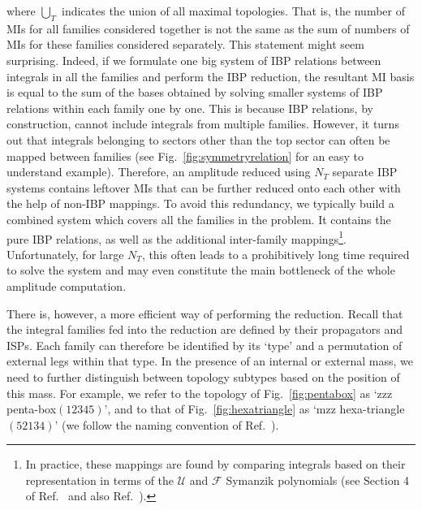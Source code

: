 \documentclass[main.tex]{subfiles}
\begin{document}
where $\bigcup_T$ indicates the union of all maximal topologies. That is, the number of MIs for all families considered together is not the same as the sum of numbers of MIs for these families considered separately. This statement might seem surprising. Indeed, if we formulate one big system of IBP relations between integrals in all the families and perform the IBP reduction, the resultant MI basis is equal to the sum of the bases obtained by solving smaller systems of IBP relations within each family one by one. This is because IBP relations, by construction, cannot include integrals from multiple families. However, it turns out that integrals belonging to sectors other than the top sector can often be mapped between families (see  Fig.~\ref{fig:symmetryrelation} for an easy to understand example). Therefore, an amplitude reduced using $N_T$ separate IBP systems contains leftover MIs that can be further reduced onto each other with the help of non-IBP mappings. To avoid this redundancy, we typically build a combined system which covers all the families in the problem. It contains the pure IBP relations, as well as the additional inter-family mappings\footnote{In practice, these mappings are found by comparing integrals based on their representation in terms of the $\mathcal{U}$ and $\mathcal{F}$ Symanzik polynomials (see Section 4 of Ref.~\cite{Lee:2012cn} and also Ref.~\cite{Pak:2011xt}).}. Unfortunately, for large $N_T$, this often leads to a prohibitively long time required to solve the system and may even constitute the main bottleneck of the whole amplitude computation.

There is, however, a more efficient way of performing the reduction. Recall that the integral families fed into the reduction are defined by their propagators and ISPs. Each family can therefore be identified by its `type' and a permutation of external legs within that type. In the presence of an internal or external mass, we need to further distinguish between topology subtypes based on the position of this mass. For example, we refer to the topology of Fig.~\ref{fig:pentabox} as `zzz penta-box$(12345)$', and to that of Fig.~\ref{fig:hexatriangle} as `mzz hexa-triangle$(52134)$' (we follow the naming convention of Ref.~\cite{Abreu:2020jxa}).
\end{document}
